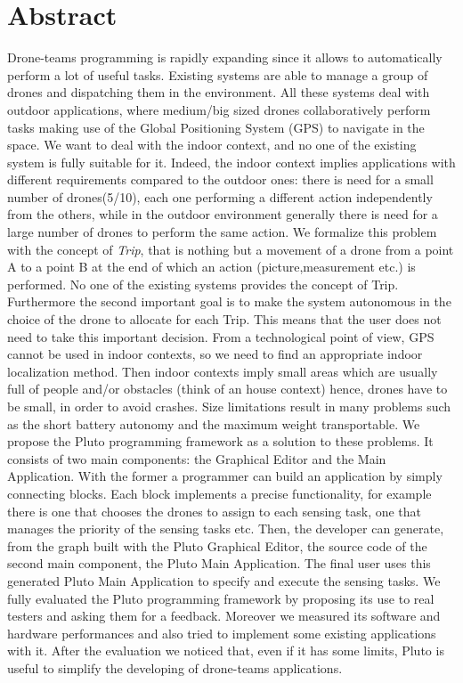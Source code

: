 \chapter*{Abstract}


Drone-teams programming is rapidly expanding since it allows to automatically perform a lot of useful tasks.
Existing systems are able to manage a group of drones and dispatching them in the environment. 
All these systems deal with outdoor applications, where medium/big sized drones collaboratively perform tasks making use of the Global Positioning System (GPS) to navigate in the space.
We want to deal with the indoor context, and no one of the existing system is fully suitable for it.
Indeed, the indoor context implies applications with different requirements compared to the outdoor ones:
there is need for a small number of drones(5/10), each one performing a different action independently from the others, while in the outdoor environment generally there is need for a large number of drones to perform the same action.
We formalize this problem with the concept of \textit{Trip}, that is nothing but a movement of a drone from a point A to a point B at the end of which an action (picture,measurement etc.) is performed. 
No one of the existing systems provides the concept of Trip.
Furthermore the second important goal is to make the system autonomous in the choice of the drone to allocate for each Trip. 
This means that the user does not need to take this important decision.
From a technological point of view, GPS cannot be used in indoor contexts, so we need to find an appropriate indoor localization method.
Then indoor contexts imply small areas which are usually full of people and/or obstacles (think of an house context) hence, drones have to be small, in order to avoid crashes.
Size limitations result in many problems such as the short battery autonomy and the maximum weight transportable.
We propose the Pluto programming framework as a solution to these problems. 
It consists of two main components: the Graphical Editor and the Main Application.
With the former a programmer can build an application by simply connecting blocks.
Each block implements a precise functionality, for example there is one that chooses the drones to assign to each sensing task, one that manages the priority of the sensing tasks etc.
Then, the developer can generate, from the graph built with the Pluto Graphical Editor, the source code of the second main component, the Pluto Main Application.
The final user uses this generated Pluto Main Application to specify and execute the sensing tasks.
We fully evaluated the Pluto programming framework by proposing its use to real testers and asking them for a feedback. 
Moreover we measured its software and hardware performances and also tried to implement some existing applications with it.
After the evaluation we noticed that, even if it has some limits, Pluto is useful to simplify the developing of drone-teams applications.